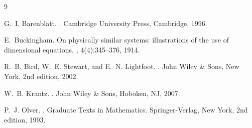 \documentclass[11pt,a4paper]{article}
\theoremstyle{definition}
\theoremstyle{plain}
\theoremstyle{remark}
\begin{document}
\begin{thebibliography}{9}

G.~I. Barenblatt.
.
\newblock Cambridge University Press, Cambridge, 1996.

E.~Buckingham.
\newblock On physically similar systems: illustrations of the use of dimensional equations.
, 4(4):345--376, 1914.

R.~B. Bird, W.~E. Stewart, and E.~N. Lightfoot.
.
\newblock John Wiley \& Sons, New York, 2nd edition, 2002.

W.~B. Krantz.
.
\newblock John Wiley \& Sons, Hoboken, NJ, 2007.

P.~J. Olver.
.
\newblock Graduate Texts in Mathematics. Springer-Verlag, New York, 2nd edition, 1993.

\end{thebibliography}
\end{document}
